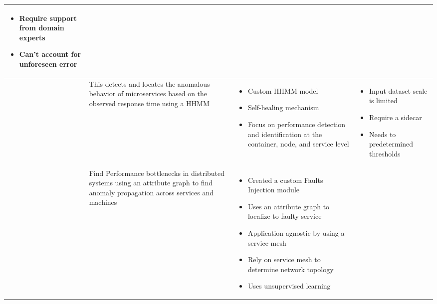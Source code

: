 \begin{longtable}{| p{20mm} | p{40mm} | p{43mm} | p{46mm} |}
\begin{itemize}[leftmargin=*,noitemsep,nolistsep]
    \item Require support from domain experts
    \item Can't account for unforeseen error
  \vspace{-7mm}
  \end{itemize} \\ \hline
  \cite{samir2019dla} &
  This detects and locates the anomalous behavior of microservices based on the observed response time using a HHMM &
  \vspace{-8mm}
  \begin{itemize}[leftmargin=*,noitemsep,nolistsep] 
    \item Custom HHMM model
    \item Self-healing mechanism
    \item Focus on performance detection and identification at the container, node, and service level
  \vspace{-7mm}
  \end{itemize} &
  \vspace{-8mm}
  \begin{itemize}[leftmargin=*,noitemsep,nolistsep] 
    \item Input dataset scale is limited
    \item Require a sidecar
    \item Needs to predetermined thresholds
  \vspace{-7mm}
  \end{itemize} \\ \hline
  \cite{wu2020microrca} &
  Find Performance bottlenecks in distributed systems using an attribute graph to find anomaly propagation across services and machines &
  \vspace{-8mm}
  \begin{itemize}[leftmargin=*,noitemsep,nolistsep] 
    \item Created a custom Faults Injection module
    \item Uses an attribute graph to localize to faulty service
    \item Application-agnostic by using a service mesh
    \item Rely on service mesh to determine network topology
    \item Uses unsupervised learning
  \vspace{-7mm}
  \end{itemize} &
  \vspace{-8mm}
  \begin{itemize}[leftmargin=*,noitemsep,nolistsep] 

\end{itemize}
\end{longtable}
